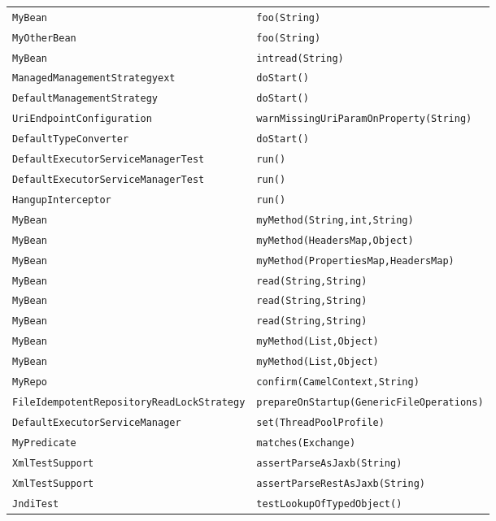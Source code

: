 \begin{center}
\begin{longtable}{ll}
\lstinline/MyBean/&{\lstinline/foo(String)/}\\
\lstinline/MyOtherBean/&{\lstinline/foo(String)/}\\
\lstinline/MyBean/&{\lstinline/intread(String)/}\\
\lstinline/ManagedManagementStrategyext/&{\lstinline/doStart()/}\\
\lstinline/DefaultManagementStrategy/&{\lstinline/doStart()/}\\
\lstinline/UriEndpointConfiguration/&{\lstinline/warnMissingUriParamOnProperty(String)/}\\
\lstinline/DefaultTypeConverter/&{\lstinline/doStart()/}\\
\lstinline/DefaultExecutorServiceManagerTest/&{\lstinline/run()/}\\
\lstinline/DefaultExecutorServiceManagerTest/&{\lstinline/run()/}\\
\lstinline/HangupInterceptor/&{\lstinline/run()/}\\
\lstinline/MyBean/&{\lstinline/myMethod(String,int,String)/}\\
\lstinline/MyBean/&{\lstinline/myMethod(HeadersMap,Object)/}\\
\lstinline/MyBean/&{\lstinline/myMethod(PropertiesMap,HeadersMap)/}\\
\lstinline/MyBean/&{\lstinline/read(String,String)/}\\
\lstinline/MyBean/&{\lstinline/read(String,String)/}\\
\lstinline/MyBean/&{\lstinline/read(String,String)/}\\
\lstinline/MyBean/&{\lstinline/myMethod(List,Object)/}\\
\lstinline/MyBean/&{\lstinline/myMethod(List,Object)/}\\
\lstinline/MyRepo/&{\lstinline/confirm(CamelContext,String)/}\\
\lstinline/FileIdempotentRepositoryReadLockStrategy/&{\lstinline/prepareOnStartup(GenericFileOperations)/}\\
\lstinline/DefaultExecutorServiceManager/&{\lstinline/set(ThreadPoolProfile)/}\\
\lstinline/MyPredicate/&{\lstinline/matches(Exchange)/}\\
\lstinline/XmlTestSupport/&{\lstinline/assertParseAsJaxb(String)/}\\
\lstinline/XmlTestSupport/&{\lstinline/assertParseRestAsJaxb(String)/}\\
\lstinline/JndiTest/&{\lstinline/testLookupOfTypedObject()/}\\

\end{longtable}
\end{center}
